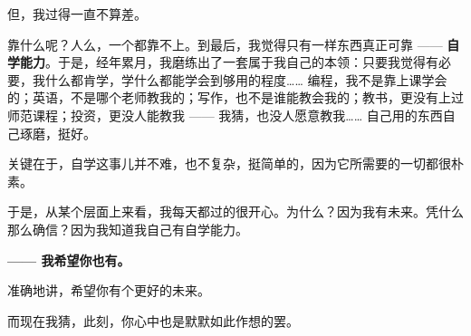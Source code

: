 \documentclass[11pt]{article}
\begin{document}
但，我过得一直不算差。

靠什么呢？人么，一个都靠不上。到最后，我觉得只有一样东西真正可靠 ------
\textbf{自学能力}。于是，经年累月，我磨练出了一套属于我自己的本领：只要我觉得有必要，我什么都肯学，学什么都能学会到够用的程度\ldots{}\ldots{}
编程，我不是靠上课学会的；英语，不是哪个老师教我的；写作，也不是谁能教会我的；教书，更没有上过师范课程；投资，更没人能教我
------ 我猜，也没人愿意教我\ldots{}\ldots{} 自己用的东西自己琢磨，挺好。

关键在于，自学这事儿并不难，也不复杂，挺简单的，因为它所需要的一切都很朴素。

于是，从某个层面上来看，我每天都过的很开心。为什么？因为我有未来。凭什么那么确信？因为我知道我自己有自学能力。

\textbf{------ 我希望你也有。}

准确地讲，希望你有个更好的未来。

而现在我猜，此刻，你心中也是默默如此作想的罢。


    
    
    
    
\end{document}
